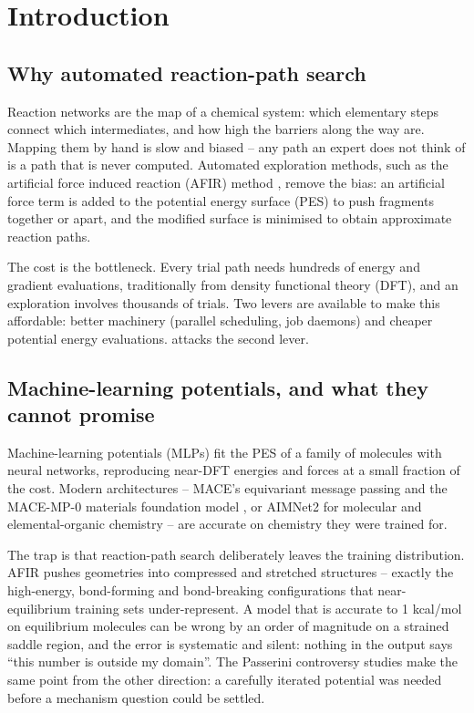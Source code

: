 \chapter{Introduction}
\label{ch:introduction}

\section{Why automated reaction-path search}

Reaction networks are the map of a chemical system: which elementary steps
connect which intermediates, and how high the barriers along the way are.
Mapping them by hand is slow and biased -- any path an expert does not think
of is a path that is never computed.  Automated exploration methods, such as
the artificial force induced reaction (AFIR) method \cite{maeda2016afir},
remove the bias: an artificial force term is added to the potential energy
surface (PES) to push fragments together or apart, and the modified surface
is minimised to obtain approximate reaction paths.

The cost is the bottleneck.  Every trial path needs hundreds of energy and
gradient evaluations, traditionally from density functional theory (DFT), and
an exploration involves thousands of trials.  Two levers are available to
make this affordable: better machinery (parallel scheduling, job daemons)
and cheaper potential energy evaluations.  \jns{} attacks the second lever.

\section{Machine-learning potentials, and what they cannot promise}

Machine-learning potentials (MLPs) fit the PES of a family of molecules with
neural networks, reproducing near-DFT energies and forces at a small
fraction of the cost.  Modern architectures -- MACE's equivariant message
passing \cite{batatia2022mace} and the MACE-MP-0 materials foundation model
\cite{batatia2025mpa}, or AIMNet2 for molecular and elemental-organic
chemistry \cite{anstine2025aimnet2} -- are accurate on chemistry they were
trained for.

The trap is that reaction-path search deliberately leaves the training
distribution.  AFIR pushes geometries into compressed and stretched
structures -- exactly the high-energy, bond-forming and bond-breaking
configurations that near-equilibrium training sets under-represent.  A
model that is accurate to 1 kcal/mol on equilibrium molecules can be wrong
by an order of magnitude on a strained saddle region, and the error is
systematic and silent: nothing in the output says ``this number is outside
my domain''.  The Passerini controversy studies
\cite{staub2023,staub2025} make the same point from the other direction: a
carefully iterated potential was needed before a mechanism question could be
settled.

